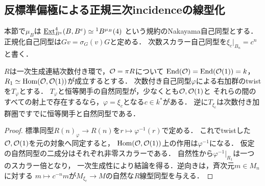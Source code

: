 \subsection{反標準偏極による正規三次incidenceの線型化}
\label{sec:nakayama-normal-incidence}
本節で$\mu_B$は
$\underline{\operatorname{Ext}}^4_{B^e}(B,B^e)\simeq {}^1B^{\mu_B}(4)$
という規約のNakayama自己同型とする．
正規化自己同型は$Gv=\sigma_G(v)G$と定める．
次数スカラー自己同型を$\xi_c|_{B_n}=c^n$と書く．

\begin{lemma}[飽和された構造対象が自己同型のスカラー性を検出する]
\label{lem:twist-scalar-detection}
$R$は一次生成連結次数付き環で，$\mathcal O=\pi R$について
$\operatorname{End}(\mathcal O)=\operatorname{End}(\mathcal O(1))=k$，
$R_1\simeq\operatorname{Hom}(\mathcal O,\mathcal O(1))$が成立するとする．
次数付き自己同型$\varphi$による右加群のtwistを$T_\varphi$とする．
$T_\varphi$と恒等関手の自然同型が，少なくとも$\mathcal O,\mathcal O(1)$と
それらの間のすべての射上で存在するなら，$\varphi=\xi_c$となる$c\in k^*$がある．
逆に$T_{\xi_c}$は次数付き加群圏ですでに恒等関手と自然同型である．
\end{lemma}
\begin{proof}
標準同型$R(n)_\varphi\to R(n)$を$r\mapsto\varphi^{-1}(r)$で定める．
これでtwistした$\mathcal O,\mathcal O(1)$を元の対象へ同定すると，
$\operatorname{Hom}(\mathcal O,\mathcal O(1))$上の作用は$\varphi^{-1}$になる．
仮定の自然同型の二成分はそれぞれ非零スカラーである．
自然性から$\varphi^{-1}|_{R_1}$は一つのスカラー倍となり，
一次生成性により結論を得る．逆向きは，斉次元$m\in M_n$に対する
$m\mapsto c^{-n}m$が$M_{\xi_c}\to M$の自然な$R$線型同型を与える．
\end{proof}

